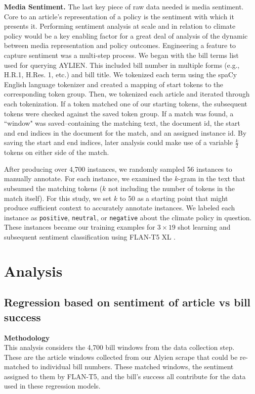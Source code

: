 \documentclass[letterpaper,11pt]{article}
\begin{document}
\textbf{Media Sentiment.} The last key piece of raw data needed is media sentiment. Core to an article's representation of a policy is the sentiment with which it presents it. Performing sentiment analysis at scale and in relation to climate policy would be a key enabling factor for a great deal of analysis of the dynamic between media representation and policy outcomes. Engineering a feature to capture sentiment was a multi-step process. We began with the bill terms list used for querying AYLIEN. This included bill number in multiple forms (e.g., H.R.1, H.Res. 1, etc.) and bill title. We tokenized each term using the spaCy English language tokenizer and created a mapping of start tokens to the corresponding token group. Then, we tokenized each article and iterated through each tokenization. If a token matched one of our starting tokens, the subsequent tokens were checked against the saved token group. If a match was found, a ``window" was saved--containing the matching text, the document id, the start and end indices in the document for the match, and an assigned instance id. By saving the start and end indices, later analysis could make use of a variable $\frac{k}{2}$ tokens on either side of the match.

After producing over 4,700 instances, we randomly sampled 56 instances to manually annotate. For each instance, we examined the $k$-gram in the text that subsumed the matching tokens ($k$ not including the number of tokens in the match itself). For this study, we set $k$ to 50 as a starting point that might produce sufficient context to accurately annotate instances. We labeled each instance as \verb|positive|, \verb|neutral|, or \verb|negative| about the climate policy in question. These instances became our training examples for $3 \times 19$ shot learning and subsequent sentiment classification using FLAN-T5 XL \cite{flan-t5-xl}.


\section{Analysis}

\vspace{.1in}
\subsection{Regression based on sentiment of article vs bill success}
    \textbf{Methodology} \\
    This analysis considers the 4,700 bill windows from the data collection step. These are the article windows collected from our Alyien scrape that could be re-matched to individual bill numbers. These matched windows, the sentiment assigned to them by FLAN-T5, and the bill's success all contribute for the data used in these regression models. 
\end{document}
